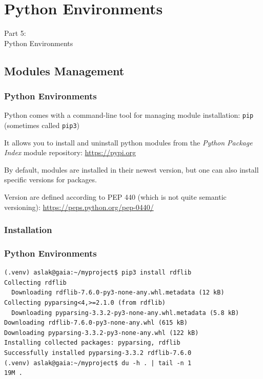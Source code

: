 {
\renewcommand{\bgcolor}{env}

\section{Python Environments}
\begin{frame}
  \vspace{25mm}
  \begin{center}
    \Huge{Part 5:\\Python Environments}
  \end{center}
\end{frame}

\subsection{Modules Management}
\begin{frame}[fragile]
  \frametitle{Python Environments }
  \vspace{3mm}
  Python comes with a command-line tool for managing module installation: \texttt{pip} (sometimes called \texttt{pip3})
  
  \pause
  \vspace{5mm}
  It allows you to install and uninstall python modules from the \textsl{Python Package Index} module repository: \url{https://pypi.org}
  
  \pause
  \vspace{5mm}
  By default, modules are installed in their newest version, but one can also install specific versions for packages.
  
  \pause
  \vspace{5mm}
  Version are defined according to PEP 440 (which is not quite semantic versioning): \url{https://peps.python.org/pep-0440/}
\end{frame}

\subsubsection{Installation}
\begin{frame}[fragile]
  \frametitle{Python Environments  }
  \vspace{3mm}
  \begin{verbatim}
(.venv) aslak@gaia:~/myproject$ pip3 install rdflib
Collecting rdflib
  Downloading rdflib-7.6.0-py3-none-any.whl.metadata (12 kB)
Collecting pyparsing<4,>=2.1.0 (from rdflib)
  Downloading pyparsing-3.3.2-py3-none-any.whl.metadata (5.8 kB)
Downloading rdflib-7.6.0-py3-none-any.whl (615 kB)
Downloading pyparsing-3.3.2-py3-none-any.whl (122 kB)
Installing collected packages: pyparsing, rdflib
Successfully installed pyparsing-3.3.2 rdflib-7.6.0
(.venv) aslak@gaia:~/myproject$ du -h . | tail -n 1
19M	.
  \end{verbatim}
\end{frame}

}
